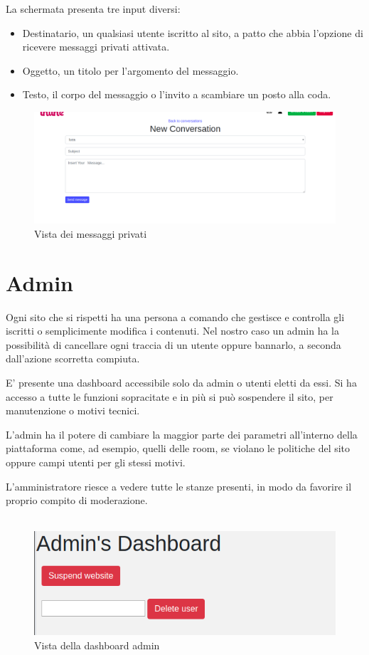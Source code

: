 	La schermata presenta tre input diversi:
	\begin{itemize}
		\item Destinatario, un qualsiasi utente iscritto al sito, a patto che abbia l'opzione di ricevere messaggi privati attivata.
		\item Oggetto, un titolo per l'argomento del messaggio.
		\item Testo, il corpo del messaggio o l'invito a scambiare un posto alla coda.
	\end{itemize}
	\begin{figure}[H]
		\includegraphics[width=\columnwidth]{./media/image10.png}
		\caption{Vista dei messaggi privati}
	\end{figure}

	\section{Admin}
	Ogni sito che si rispetti ha una persona a comando che gestisce e controlla gli iscritti o semplicimente modifica i contenuti.
	Nel nostro caso un admin ha la possibilità di cancellare ogni traccia di un utente oppure bannarlo, a seconda dall'azione scorretta compiuta.
	
	E' presente una dashboard accessibile solo da admin o utenti eletti da essi. Si ha accesso a tutte le funzioni sopracitate e in più si può sospendere il sito, per manutenzione o motivi tecnici.
	
	L'admin ha il potere di cambiare la maggior parte dei parametri all'interno della piattaforma come, ad esempio, quelli delle room, se violano le politiche del sito oppure campi utenti per gli stessi motivi. 
	
	L'amministratore riesce a vedere tutte le stanze presenti, in modo da favorire il proprio compito di moderazione.\\\\
	
	\begin{figure}[H]
		\includegraphics[width=\columnwidth]{./media/image2.png}
		\caption{Vista della dashboard admin}
	\end{figure}

